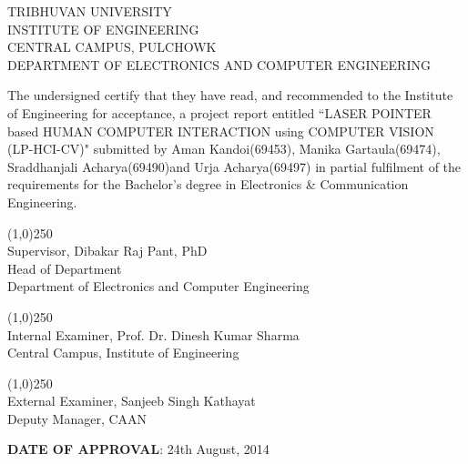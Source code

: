       \vspace{1cm}  
      \begin{center} 
       TRIBHUVAN UNIVERSITY \\
        INSTITUTE OF ENGINEERING \\
        CENTRAL CAMPUS, PULCHOWK\\
        DEPARTMENT OF ELECTRONICS AND COMPUTER ENGINEERING\\
       \end{center}
       
        \vspace{1cm}
        
        The undersigned certify that they have read, and recommended to the Institute of
Engineering for acceptance, a project report entitled “LASER POINTER based HUMAN­ COMPUTER INTERACTION using COMPUTER VISION (LP-­HCI-­CV)" submitted by Aman Kandoi(69453), 
Manika Gartaula(69474), 
Sraddhanjali Acharya(69490)and 
Urja Acharya(69497) in partial fulfilment of the requirements for the Bachelor's degree in Electronics \& Communication Engineering.

		\vspace{1cm}
		\begin{flushleft}
		
        \line(1,0){250}\\
		Supervisor, Dibakar Raj Pant, PhD\\
		Head of Department\\
		Department of Electronics and Computer Engineering\\
		\vspace{1cm}
		
		\line(1,0){250}\\
		Internal Examiner, Prof. Dr. Dinesh Kumar Sharma\\
		Central Campus, Institute of Engineering\\
		\vspace{1cm}
		
		\line(1,0){250}\\
		External Examiner, Sanjeeb Singh Kathayat\\
		Deputy Manager, CAAN
		\vspace{1.5cm}
		
		\textbf{DATE OF APPROVAL}: 24th August, 2014    
     \end{flushleft}
